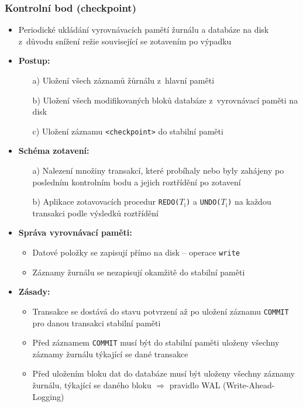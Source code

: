 \documentclass[a4paper,10pt]{article}
\newcommand{\pojem}[2]{\item \textbf{#1:}\quad #2}
\newcommand{\tedy}{$\Rightarrow$ }
\begin{document}
      \subsubsection{Kontrolní bod (checkpoint)}
        \begin{itemize}
          \item Periodické ukládání vyrovnávacích pamětí žurnálu a databáze na disk z~důvodu snížení režie související se zotavením po výpadku
          \pojem{Postup}
          \begin{itemize}
            \item[a)] Uložení všech záznamů žůrnálu z~hlavní paměti
            \item[b)] Uložení všech modifikovaných bloků databáze z~vyrovnávací paměti na disk
            \item[c)] Uložení záznamu \texttt{<checkpoint>} do stabilní paměti
          \end{itemize}
          \pojem{Schéma zotavení}
          \begin{itemize}
            \item[a)] Nalezení množiny transakcí, které probíhaly nebo byly zahájeny po posledním kontrolním bodu a jejich roztřídění po zotavení
            \item[b)] Aplikace zotavovacích procedur \texttt{REDO($T_\textrm{i}$)} a \texttt{UNDO($T_\textrm{i}$)} na každou transakci podle výsledků roztřídění
          \end{itemize}
          \begin{figure}[h!]
            \centering
          \end{figure}

          \pojem{Správa vyrovnávací paměti}
          \begin{itemize}
            \item Datové položky se zapisují přímo na disk -- operace \texttt{write}
            \item Záznamy žurnálu se nezapisují okamžitě do stabilní paměti
          \end{itemize}
          \pojem{Zásady}
          \begin{itemize}
            \item Transakce se dostává do stavu potvrzení až po uložení záznamu \texttt{COMMIT} pro danou transakci stabilní paměti
            \item Před záznamem \texttt{COMMIT} musí být do stabilní paměti uloženy všechny záznamy žurnálu týkající se dané transakce
            \item Před uložením bloku dat do databáze musí být uloženy všechny záznamy žurnálu, týkající se daného bloku \tedy pravidlo WAL (Write-Ahead-Logging)
          \end{itemize}
        \end{itemize}
\end{document}
